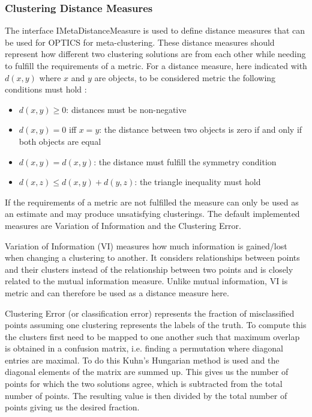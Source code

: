 \documentclass[
	a4paper,
	english,
	twoside,
	openright,               
	11pt                            
	]{report}
\begin{document}
\subsubsection{Clustering Distance Measures}
The interface IMetaDistanceMeasure is used to define distance measures that can be used for OPTICS for meta-clustering. These distance measures should represent how different two clustering solutions are from each other while needing to fulfill the requirements of a metric. For a distance measure, here indicated with $d(x,y)$ where $x$ and $y$ are objects, to be considered metric the following conditions must hold \cite{10.5555/1756006.1953024}:
\begin{itemize}
  \item $d(x,y)\geq0$: distances must be non-negative
  \item $d(x,y)=0$ iff $x=y$: the distance between two objects is zero if and only if both objects are equal
  \item $d(x,y)=d(x,y)$: the distance must fulfill the symmetry condition
  \item $d(x,z)\leq d(x,y)+d(y,z)$: the triangle inequality must hold
\end{itemize}

If the requirements of a metric are not fulfilled the measure can only be used as an estimate and may produce unsatisfying clusterings. The default implemented measures are Variation of Information and the Clustering Error. 

Variation of Information (VI) \cite{10.1007/978-3-540-45167-9_14} measures how much information is gained/lost when changing a clustering to another. It considers relationships between points and their clusters instead of the relationship between two points and is closely related to the mutual information measure. Unlike mutual information, VI is metric and can therefore be used as a distance measure here.

Clustering Error (or classification error) \cite{MEILA2007873} represents the fraction of misclassified points assuming one clustering represents the labels of the truth. To compute this the clusters first need to be mapped to one another such that maximum overlap is obtained in a confusion matrix, i.e. finding a permutation where diagonal entries are maximal. To do this Kuhn’s Hungarian method \cite{Kuhn2010} is used and the diagonal elements of the matrix are summed up. This gives us the number of points for which the two solutions agree, which is subtracted from the total number of points. The resulting value is then divided by the total number of points giving us the desired fraction.
\end{document}
